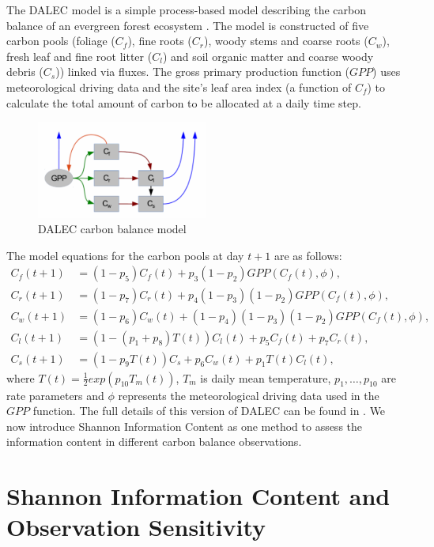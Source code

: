 \documentclass[11pt]{article}
\begin{document}
The DALEC model is a simple process-based model describing the carbon balance of an evergreen forest ecosystem \cite{williams2005improved}. The model is constructed of five carbon pools (foliage ($C_f$), fine roots ($C_r$), woody stems and coarse roots ($C_w$), fresh leaf and fine root litter ($C_l$) and soil organic matter and coarse woody debris ($C_s$)) linked via fluxes. The gross primary production function ($GPP$) uses meteorological driving data and the site's leaf area index (a function of $C_f$) to calculate the total amount of carbon to be allocated at a daily time step.   
\begin{figure}[h!]
    \centering
    \includegraphics[width=0.5\textwidth]{DALECpic.png}
    \caption{DALEC carbon balance model \cite{delahaies2013regularization}}
    \label{fig:DALEC_mod}
\end{figure}
The model equations for the carbon pools at day $t+1$ are as follows:
\begin{align}
C_f(t+1)&=(1-p_5)C_f(t)+p_3(1-p_2)GPP(C_f(t),\phi),
\\C_r(t+1)&=(1-p_7)C_r(t)+p_4(1-p_3)(1-p_2)GPP(C_f(t),\phi), 
\\C_w(t+1)&=(1-p_6)C_w(t)+(1-p_4)(1-p_3)(1-p_2)GPP(C_f(t),\phi), 
\\C_l(t+1)&=(1-(p_1+p_8)T(t))C_l(t)+p_5C_f(t)+p_7C_r(t), 
\\C_s(t+1)&=(1-p_9T(t))C_s+p_6C_w(t)+p_1T(t)C_l(t),
\end{align}
where $T(t)=\frac{1}{2}exp(p_{10}T_m(t))$, $T_m$ is daily mean temperature, $p_1,\ldots,p_{10}$ are rate parameters and $\phi$ represents the meteorological driving data used in the $GPP$ function. The full details of this version of DALEC can be found in \cite{williams2005improved}. We now introduce Shannon Information Content as one method to assess the information content in different carbon balance observations.

\section*{Shannon Information Content and Observation Sensitivity}
\end{document}
